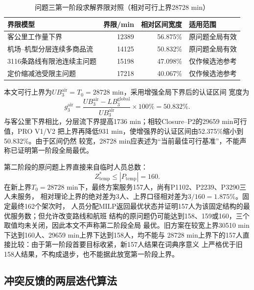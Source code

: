 \documentclass[UTF8,a4paper,zihao=5]{ctexart}
\begin{document}
\begin{table}[htbp]
  \centering
  \caption{问题三第一阶段求解界限对照（相对可行上界28728 min）}
  \label{tab:q3-bound-comparison}
  \begin{tabularx}{\linewidth}{XrrX}
    \toprule
    界限模型 & 界限/min & 相对区间宽度 & 适用范围 \\
    \midrule
    客公里工作量下界 & 12389 & 56.875\% & 原问题全局有效 \\
    机场--机型分层连续多商品流 & 14125 & 50.832\% & 原问题全局有效 \\
    3116条路线有限池连续主问题 & 15198 & 47.098\% & 仅作候选池参考 \\
    定价缩减池受限主问题 & 17218 & 40.067\% & 仅作候选池参考 \\
    \bottomrule
  \end{tabularx}
\end{table}

本文可行上界为$UB_3^{\mathrm{air}}=T_0=28728$ min，采用增强全局下界后的认证区间
宽度为
\begin{equation}
  g_3^{\mathrm{air}}
  =\frac{UB_3^{\mathrm{air}}-LB_3^{\mathrm{global}}}{UB_3^{\mathrm{air}}}
  \times100\%=50.832\%.
  \label{eq:q3-aircraft-bound-gap}
\end{equation}
与客公里下界相比，分层流下界提高1736 min；相较Closure--P2的29659 min可行值，PRO V1/V2
把上界再降低931 min，使增强界的认证区间由52.375\%缩小到50.832\%。由于区间仍然
较宽，28728 min应表述为“当前最佳可行基准”，不能声称已证明第一阶段全局最优。

第二阶段的原问题上界直接来自临时人员总数：
\begin{equation}
  Z_{\mathrm{temp}}^*\le |P_{\mathrm{temp}}|=160.
  \label{eq:q3-temporary-upper-bound}
\end{equation}
在新上界$T_0=28728$ min下，最终方案服务157人，尚有P1102、P2239、P3290三人未服务，
相对理论上界的绝对差为3人、上界口径相对差为$3/160=1.875\%$。固定最终162个架次时，
人员分配MILP返回最优状态并证明157人为该固定结构的最优服务数；但允许改变路线和航班
结构的原问题仍可能达到158、159或160，三个取值均未关闭，因此本文不声称第二阶段全局
最优。旧方案在较宽上界30510 min下达到160人、29659 min上界下达到158人，均不能与
28728 min上界下的157人直接比较：由于第一阶段首要目标收紧，新157人结果在词典序意义
上严格优于旧158人结果，不构成退步，也不能据此放宽第一阶段上界。

\subsection{冲突反馈的两层迭代算法}
\end{document}
